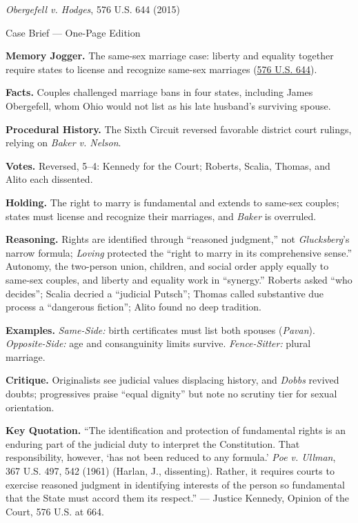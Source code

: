 \documentclass[12pt]{article}
\begin{document}
\begin{center}
{\Large \textit{Obergefell v. Hodges}, 576 U.S. 644 (2015)\par}
\vspace{0.3em}
{\normalsize Case Brief --- One-Page Edition\par}
\end{center}

\textbf{Memory Jogger.} The same-sex marriage case: liberty and equality together require states to license and recognize same-sex marriages (\href{https://www.courtlistener.com/opinion/2812209/obergefell-v-hodges/}{576 U.S. 644}).

\textbf{Facts.} Couples challenged marriage bans in four states, including James Obergefell, whom Ohio would not list as his late husband's surviving spouse.

\textbf{Procedural History.} The Sixth Circuit reversed favorable district court rulings, relying on \textit{Baker v. Nelson}.

\textbf{Votes.} Reversed, 5--4: Kennedy for the Court; Roberts, Scalia, Thomas, and Alito each dissented.

\textbf{Holding.} The right to marry is fundamental and extends to same-sex couples; states must license and recognize their marriages, and \textit{Baker} is overruled.

\textbf{Reasoning.} Rights are identified through ``reasoned judgment,'' not \textit{Glucksberg}'s narrow formula; \textit{Loving} protected the ``right to marry in its comprehensive sense.'' Autonomy, the two-person union, children, and social order apply equally to same-sex couples, and liberty and equality work in ``synergy.'' Roberts asked ``who decides''; Scalia decried a ``judicial Putsch''; Thomas called substantive due process a ``dangerous fiction''; Alito found no deep tradition.

\textbf{Examples.} \emph{Same-Side:} birth certificates must list both spouses (\textit{Pavan}). \emph{Opposite-Side:} age and consanguinity limits survive. \emph{Fence-Sitter:} plural marriage.

\textbf{Critique.} Originalists see judicial values displacing history, and \textit{Dobbs} revived doubts; progressives praise ``equal dignity'' but note no scrutiny tier for sexual orientation.

\textbf{Key Quotation.} ``The identification and protection of fundamental rights is an enduring part of the judicial duty to interpret the Constitution. That responsibility, however, `has not been reduced to any formula.' \textit{Poe v. Ullman}, 367 U.S. 497, 542 (1961) (Harlan, J., dissenting). Rather, it requires courts to exercise reasoned judgment in identifying interests of the person so fundamental that the State must accord them its respect.'' --- Justice Kennedy, Opinion of the Court, 576 U.S. at 664.
\end{document}
